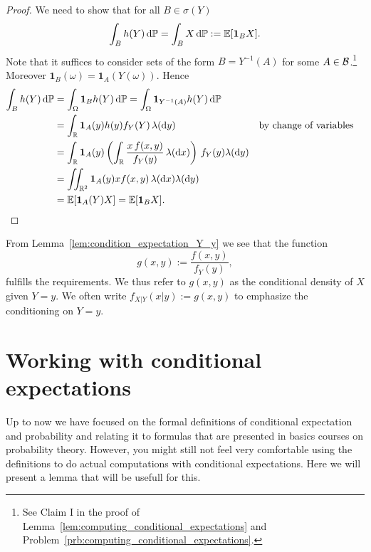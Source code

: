 \begin{proof}
We need to show that for all $B \in \sigma(Y)$
\[
	\int_B h(Y) \, \mathrm{d} \mathbb P = \int_B X \, \mathrm{d} \mathbb P := \mathbb E[\mathbf{1}_B X]. 
\]
Note that it suffices to consider sets of the form $B = Y^{-1}(A)$ for some $A \in \mathcal B$.\footnote{See Claim I in the proof of Lemma~\ref{lem:computing_conditional_expectations} and Problem~\ref{prb:computing_conditional_expectations}.} Moreover $\mathbf{1}_B(\omega) = \mathbf{1}_A(Y(\omega))$. Hence
\begin{align*}
	\int_B h(Y) \, \mathrm{d} \mathbb P &= \int_\Omega \mathbf{1}_{B} h(Y) \, \mathrm{d} \mathbb P 
	= \int_\Omega \mathbf{1}_{Y^{-1}(A)} h(Y) \, \mathrm{d} \mathbb P \\
	&= \int_{\mathbb R} \mathbf{1}_{A}(y) h(y) f_Y(Y) \, \lambda (\mathrm{d} y) &&\text{by change of variables}\\
	&= \int_{\mathbb R} \mathbf{1}_A(y) \left(\int_{\mathbb R} \frac{x \, f(x,y)}{f_Y(y)} \, \lambda(\mathrm{d} x)\right)
		\, f_Y(y) \lambda(\mathrm{d} y)\\
	&= \iint_{\mathbb R^2} \mathbf{1}_A(y) x f(x,y) \, \lambda(\mathrm{d} x) \lambda(\mathrm{d} y)\\
	&= \mathbb E[\mathbf{1}_A(Y) X] = \mathbb E[\mathbf{1}_B X].
\end{align*}
\end{proof}


From Lemma~\ref{lem:condition_expectation_Y_y} we see that the function
\begin{equation}\label{eq:def_condition_pdf}
	g(x,y) := \frac{f(x,y)}{f_Y(y)},
\end{equation}
fulfills the requirements. We thus refer to $g(x,y)$ as the conditional density of $X$ given $Y = y$. We often write $f_{X|Y}(x|y) := g(x,y)$ to emphasize the conditioning on $Y = y$. 



\section{Working with conditional expectations}

Up to now we have focused on the formal definitions of conditional expectation and probability and relating it to formulas that are presented in basics courses on probability theory. However, you might still not feel very comfortable using the definitions to do actual computations with conditional expectations. Here we will present a lemma that will be usefull for this.

